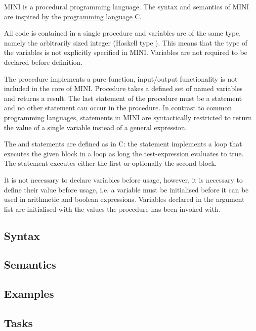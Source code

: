 \documentclass{article}
\begin{document}
MINI is a procedural programming language. The syntax and semantics of MINI are inspired by the \href{https://en.wikipedia.org/wiki/C_(programming_language)}{programming language C}.

All code is contained in a single procedure  and variables are of the same type, namely the arbitrarily sized integer (Haskell type ). This means that the type of the variables is not explicitly specified in MINI. Variables are not required to be declared before definition.

The procedure  implements a pure function, input/output functionality is not included in the core of MINI. Procedure  takes a defined set of named variables and returns a result. The last statement of the procedure must be a  statement and no other  statement can occur in the procedure. In contrast to common programming languages,  statements in MINI are syntactically restricted to return the value of a single variable instead of a general expression.

The  and  statements are defined as in C: the  statement implements a loop that executes the given block in a loop as long the test-expression evaluates to true. The  statement executes either the first or optionally the second block.

It is not necessary to declare variables before usage, however, it is necessary to define their value before usage, i.e. a variable must be initialised before it can be used in arithmetic and boolean expressions.
Variables declared in the argument list are initialised with the values the procedure has been invoked with.


\subsection{Syntax}


\subsection{Semantics}



\subsection{Examples}

\subsection{Tasks}
\end{document}
